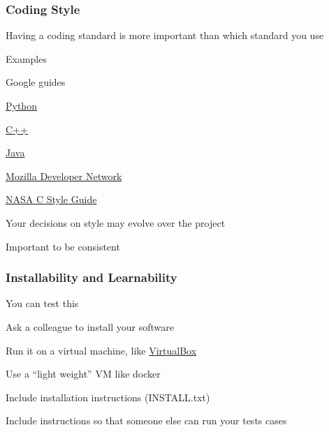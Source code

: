 \documentclass[t,12pt,numbers,fleqn]{beamer}
\begin{document}
\begin{frame}
\frametitle{Coding Style}

\bi
\item Having a coding standard is more important than which standard you use
\item Examples
\bi
\item Google guides
\bi
\item \href{https://google.github.io/styleguide/pyguide.html}{Python}
\item \href{https://google.github.io/styleguide/cppguide.html}{C++}
\item \href{https://google.github.io/styleguide/javaguide.html}{Java}
\ei
\item
  \href{https://developer.mozilla.org/en-US/docs/Mozilla/Developer_guide/Coding_Style}{Mozilla
    Developer Network}
\item \href{http://homepages.inf.ed.ac.uk/dts/pm/Papers/nasa-c-style.pdf}{NASA C
    Style Guide}
\ei
\item Your decisions on style may evolve over the project
\item Important to be consistent
\ei

\end{frame}


\begin{frame}
\frametitle{Installability and Learnability}

\bi
\item You can test this
\item Ask a colleague to install your software
\item Run it on a virtual machine, like
  \href{https://www.virtualbox.org/}{VirtualBox}
\item Use a ``light weight'' VM like docker
\item Include installation instructions (INSTALL.txt)
\item Include instructions so that someone else can run your tests cases
\ei

\end{frame}

\end{document}
